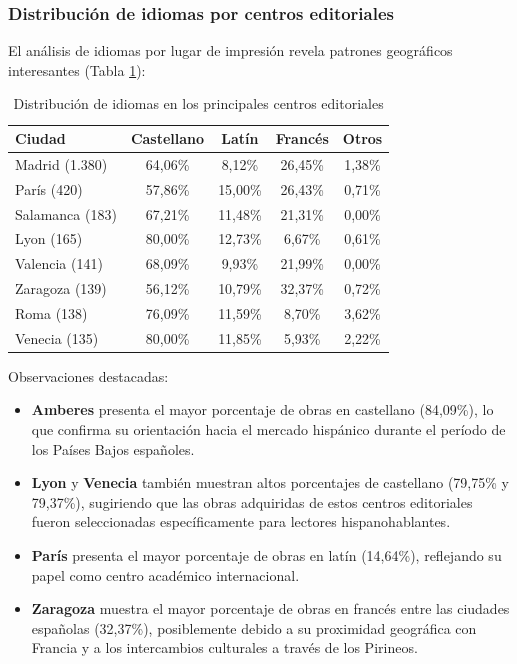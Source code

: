 \documentclass[12pt,a4paper]{article}
\begin{document}
\subsubsection{Distribución de idiomas por centros editoriales}

El análisis de idiomas por lugar de impresión revela patrones geográficos interesantes (Tabla \ref{tab:lugidiom}):

\begin{table}[h]
\centering
\caption{Distribución de idiomas en los principales centros editoriales}
\label{tab:lugidiom}
\begin{tabular}{lcccc}
\toprule
\textbf{Ciudad} & \textbf{Castellano} & \textbf{Latín} & \textbf{Francés} & \textbf{Otros} \\
\midrule
Madrid (1.380) & 64,06\% & 8,12\% & 26,45\% & 1,38\% \\
París (420) & 57,86\% & 15,00\% & 26,43\% & 0,71\% \\
Salamanca (183) & 67,21\% & 11,48\% & 21,31\% & 0,00\% \\
Lyon (165) & 80,00\% & 12,73\% & 6,67\% & 0,61\% \\
Valencia (141) & 68,09\% & 9,93\% & 21,99\% & 0,00\% \\
Zaragoza (139) & 56,12\% & 10,79\% & 32,37\% & 0,72\% \\
Roma (138) & 76,09\% & 11,59\% & 8,70\% & 3,62\% \\
Venecia (135) & 80,00\% & 11,85\% & 5,93\% & 2,22\% \\
\bottomrule
\end{tabular}
\end{table}

Observaciones destacadas:

\begin{itemize}
    \item \textbf{Amberes} presenta el mayor porcentaje de obras en castellano (84,09\%), lo que confirma su orientación hacia el mercado hispánico durante el período de los Países Bajos españoles.

    \item \textbf{Lyon} y \textbf{Venecia} también muestran altos porcentajes de castellano (79,75\% y 79,37\%), sugiriendo que las obras adquiridas de estos centros editoriales fueron seleccionadas específicamente para lectores hispanohablantes.

    \item \textbf{París} presenta el mayor porcentaje de obras en latín (14,64\%), reflejando su papel como centro académico internacional.

    \item \textbf{Zaragoza} muestra el mayor porcentaje de obras en francés entre las ciudades españolas (32,37\%), posiblemente debido a su proximidad geográfica con Francia y a los intercambios culturales a través de los Pirineos.
\end{itemize}
\end{document}
